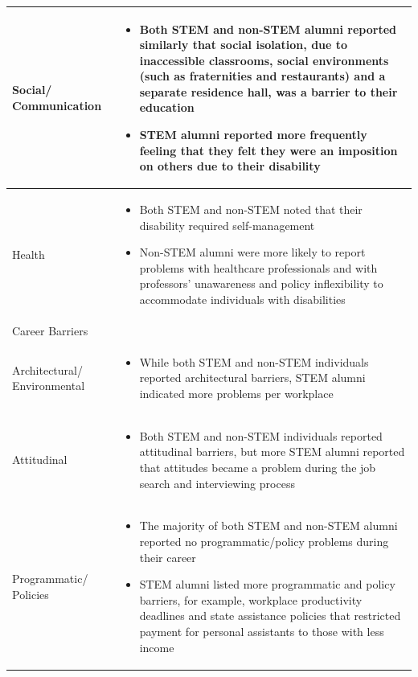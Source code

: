 \documentclass[11.5pt]{sig-alternate} %
\begin{document}
\begin{large}
\begin{table}[thp]
\begin{tabular}{|l|l|}
Social/ Communication &
\begin{itemize}[noitemsep, topsep=0pt, leftmargin=*]
\item Both STEM and non-STEM alumni reported similarly that social isolation, due to inaccessible classrooms, social environments (such as fraternities and restaurants) and a separate residence hall, was a barrier to their education
\item STEM alumni reported more frequently feeling that they felt they were an imposition on others due to their disability
\end{itemize} \\ \hline
Health &
\begin{itemize}[noitemsep, topsep=0pt, leftmargin=*]
\item Both STEM and non-STEM noted that their disability required self-management
\item Non-STEM alumni were more likely to report problems with healthcare professionals and with professors' unawareness and policy inflexibility to accommodate individuals with disabilities
\end{itemize} \\ \hline
%
Career Barriers & \\ \hline
Architectural/ Environmental & 
\begin{itemize}[noitemsep, topsep=0pt, leftmargin=*]
\item While both STEM and non-STEM individuals reported architectural barriers, STEM alumni indicated more problems per workplace
\end{itemize} \\ \hline
Attitudinal &
\begin{itemize}[noitemsep, topsep=0pt, leftmargin=*]
\item Both STEM and non-STEM individuals reported attitudinal barriers, but more STEM alumni reported that attitudes became a problem during the job search and interviewing process
\end{itemize} \\ \hline
Programmatic/ Policies &
\begin{itemize}[noitemsep, topsep=0pt, leftmargin=*]
\item The majority of both STEM and non-STEM alumni reported no programmatic/policy problems during their career
\item STEM alumni listed more programmatic and policy barriers, for example, workplace productivity deadlines and state assistance policies that restricted payment for personal assistants to those with less income

\end{itemize}
\end{tabular}
\end{table}
\end{large}
\end{document}

